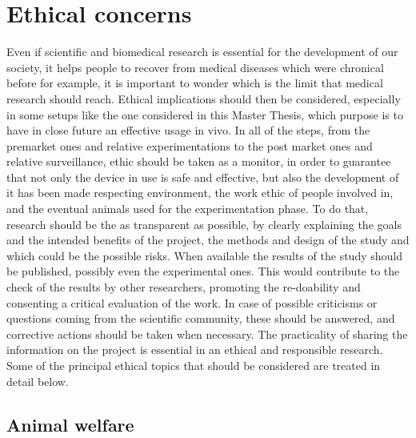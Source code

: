 \documentclass{Configuration_Files/PoliMi3i_thesis}
\begin{document}
\section{Ethical concerns}

Even if scientific and biomedical research is essential for the development of our society, it helps people to recover from medical diseases which were chronical before for example, it is important to wonder which is the limit that medical research should reach.
Ethical implications should then be considered, especially in some setups like the one considered in this Master Thesis, which purpose is to have in close future an effective usage in vivo.
In all of the steps, from the premarket ones and relative experimentations to the post market ones and relative surveillance, ethic should be taken as a monitor, in order to guarantee that not only the device in use is safe and effective, but also the development of it has been made respecting environment, the work ethic of people involved in, and the eventual animals used for the experimentation phase. To do that, research should be the as transparent as possible, by clearly explaining the goals and the intended benefits of the project, the methods and design of the study and which could be the possible risks. 
When available the results of the study should be published, possibly even the experimental ones. This would contribute to the check of the results by other researchers, promoting the re-doability and consenting a critical evaluation of the work. In case of possible criticisms or questions coming from the scientific community, these should be answered, and corrective actions should be taken when necessary. The practicality of sharing the information on the project is essential in an ethical and responsible research. 
Some of the principal ethical topics that should be considered are treated in detail below.


\subsection{Animal welfare }
\end{document}
